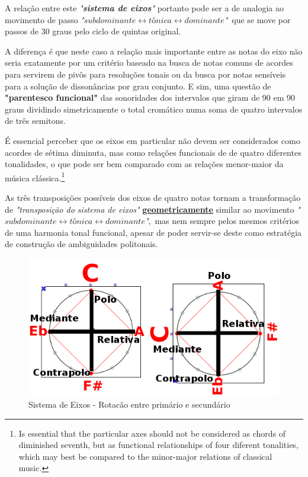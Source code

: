 \documentclass[
	12pt,				%
	openright,			%
	twoside,			%
	a4paper,			%
	english,			%
	french,				%
	spanish,			%
	brazil				%
	]{abntex2}
\begin{document}
A relação entre este \textit{"\textbf{sistema de eixos}"} portanto pode ser a de analogia ao movimento de passo \textit{"$subdominante \leftrightarrow tônica \leftrightarrow dominante$"}\ que se move por passos de 30 graus pelo ciclo de quintas original.  

A diferença é que neste caso a relação mais importante entre as notas do eixo não seria exatamente por um critério baseado na busca de notas comuns de acordes para servirem de pivôs para resoluções tonais ou da busca por notas sensíveis para a solução de dissonâncias por grau conjunto. E sim, uma questão de \textbf{"\textbf{parentesco funcional}"} das sonoridades dos intervalos que giram de 90 em 90 graus dividindo simetricamente o total cromático numa soma de quatro intervalos de três semitons.

\begin{citacao}
É essencial perceber que os eixos em particular não devem ser considerados como acordes de sétima diminuta, mas como relações funcionais de de quatro diferentes tonalidades, o que pode ser bem comparado com as relações menor-maior da música clássica.\cite[p. 3]{lendvai1971bela}\footnote{
Is essential that the particular axes should not be considered as chords of diminished seventh, but as functional relationships of four diferent tonalities, which may best be compared to the minor-major relations of classical music.\cite[p. 3]{lendvai1971bela}}
\end{citacao}

As três transposições possíveis dos eixos de quatro notas tornam a transformação de \textit{"transposição do sistema de eixos"} \textbf{\textbf{\underline{geometricamente}}} similar ao movimento \textit{"$subdominante \leftrightarrow tônica \leftrightarrow dominante$"},\ mas nem sempre pelos mesmos critérios de uma harmonia tonal funcional, apesar de poder servir-se deste como estratégia de construção de ambiguidades politonais.

\begin{figure}[!h]
	\caption{\label{fig_grafico}Sistema de Eixos - Rotacão entre primário e secundário}
	\begin{center}
	    \includegraphics[scale=0.4]{axis/PoloContrapolo.png}
	\end{center}
\end{figure}
\end{document}
